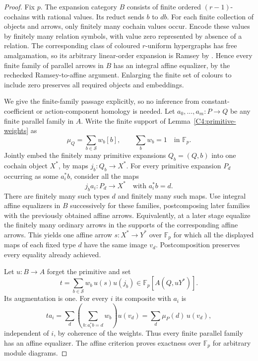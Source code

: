 \begin{proof}
Fix $p$. The expansion category $B$ consists of finite ordered
$(r-1)$-cochains with rational values. Its reduct sends $b$ to $db$.
For each finite collection of objects and arrows, only finitely many
cochain values occur. Encode these values by finitely many relation
symbols, with value zero represented by absence of a relation.
The corresponding class of coloured $r$-uniform hypergraphs has free
amalgamation, so its arbitrary linear-order expansion is Ramsey by
\cite[Theorem~1.3]{D-EHN2021}. Hence every finite family of parallel
arrows in $B$ has an integral affine equalizer, by the rechecked
Ramsey-to-affine argument. Enlarging the finite set of colours to
include zero preserves all required objects and embeddings.

We give the finite-family passage explicitly, so no inference from
constant-coefficient or action-component homology is needed. Let
$a_0,\ldots,a_m:P\to Q$ be any finite parallel family in $A$.
Write the finite support of Lemma~\ref{C4:primitive-weights} as
\[
 \mu_Q=\sum_{b\in\mathcal S}w_b[b],\qquad
 \sum_b w_b=1\quad\text{in }\mathbb F_p.
\]
Jointly embed the finitely many primitive expansions $Q_b=(Q,b)$
into one cochain object $X^*$, by maps $j_b:Q_b\to X^*$.
For every primitive expansion $P_d$ occurring as some
$a_i^*b$, consider all the maps
\[
 j_b a_i:P_d\longrightarrow X^*
       \quad\text{with }a_i^*b=d.
\]
There are finitely many such types $d$ and finitely many such maps.
Use integral affine equalizers in $B$ successively for these families,
postcomposing later families with the previously obtained affine
arrows. Equivalently, at a later stage equalize the finitely many
ordinary arrows in the supports of the corresponding affine arrows.
This yields one affine arrow $s:X^*\to Y^*$ over $\mathbb F_p$
for which all the displayed maps of each fixed type $d$ have the
same image $v_d$. Postcomposition preserves every equality already
achieved.

Let $u:B\to A$ forget the primitive and set
\[
 t=\sum_{b\in\mathcal S}w_b\,u(s)u(j_b)
      \in\mathbb F_p[A(Q,uY^*)].
\]
Its augmentation is one. For every $i$ its composite with $a_i$ is
\[
 ta_i=\sum_d\left(\sum_{b:a_i^*b=d}w_b\right)u(v_d)
      =\sum_d\mu_P(d)\,u(v_d),
\]
independent of $i$, by coherence of the weights. Thus every finite
parallel family has an affine equalizer. The affine criterion proves
exactness over $\mathbb F_p$ for arbitrary module diagrams.


\end{proof}
